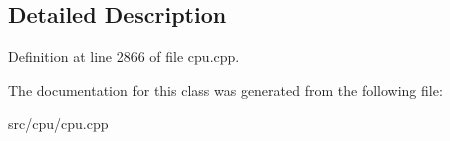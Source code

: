 \subsection{Detailed Description}


Definition at line 2866 of file cpu.\-cpp.



The documentation for this class was generated from the following file\-:\begin{DoxyCompactItemize}
\item 
src/cpu/cpu.\-cpp\end{DoxyCompactItemize}
